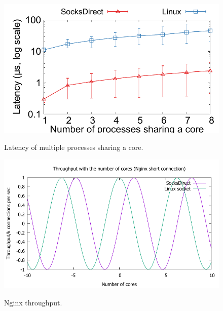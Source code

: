 \begin{figure}[t!]
\begin{minipage}{.31\textwidth}
		\centering \includegraphics[width=\textwidth]{eval/microbenchmark/sharecore-lat.pdf}
		\vspace{-15pt}
		\label{fig:eval-context-switch}
		\caption{Latency of multiple processes sharing a core.}
	\end{minipage}
	\hspace{0.01\textwidth}
	\begin{minipage}{.31\textwidth}
		\centering
		\includegraphics[width=\textwidth]{eval/microbenchmark/nginx-short-tput.pdf}
		\vspace{-15pt}
		\label{fig:eval-nginx-short}
		\caption{Nginx throughput.}
		

\end{minipage}
\end{figure}
